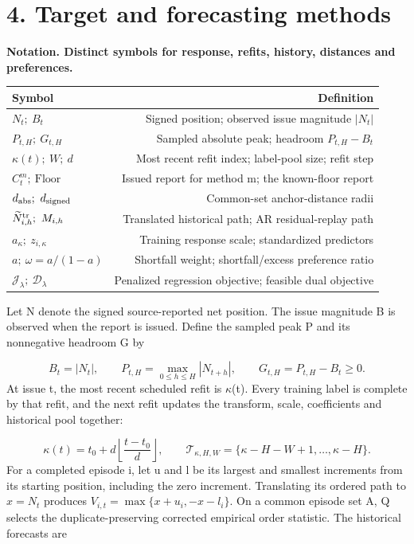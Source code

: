 \documentclass[10pt,a4paper]{article}
\begin{document}
\section*{4. Target and forecasting methods}
\begin{center}
\begin{minipage}{\linewidth}
\small\textbf{Notation. Distinct symbols for response, refits, history, distances and preferences.}\par\medskip
\centering\fontsize{8}{10}\selectfont
\begin{tabular}{lr}
\toprule
Symbol & Definition \\
\midrule
\(N_t;\ B_t\) & Signed position; observed issue magnitude \(|N_t|\) \\
\(P_{t,H};\ G_{t,H}\) & Sampled absolute peak; headroom \(P_{t,H}-B_t\) \\
\(\kappa(t);\ W;\ d\) & Most recent refit index; label-pool size; refit step \\
\(C_t^m;\ \mathrm{Floor}\) & Issued report for method m; the known-floor report \\
\(d_{\rm abs};\ d_{\rm signed}\) & Common-set anchor-distance radii \\
\(\widetilde N_{i,h}^{\rm tr};\ M_{i,h}\) & Translated historical path; AR residual-replay path \\
\(a_\kappa;\ z_{i,\kappa}\) & Training response scale; standardized predictors \\
\(a;\ \omega=a/(1-a)\) & Shortfall weight; shortfall/excess preference ratio \\
\(\mathcal J_\lambda;\ \mathcal D_\lambda\) & Penalized regression objective; feasible dual objective \\
\bottomrule
\end{tabular}
\end{minipage}
\end{center}
Let N denote the signed source-reported net position. The issue magnitude B is observed when the report is issued. Define the sampled peak P and its nonnegative headroom G by

\[
B_t=|N_t|,\qquad P_{t,H}=\max_{0\le h\le H}|N_{t+h}|,\qquad G_{t,H}=P_{t,H}-B_t\ge0.
\]
At issue t, the most recent scheduled refit is \(\kappa\)(t). Every training label is complete by that refit, and the next refit updates the transform, scale, coefficients and historical pool together:

\[
\kappa(t)=t_0+d\left\lfloor\frac{t-t_0}{d}\right\rfloor,\qquad\mathcal T_{\kappa,H,W}=\{\kappa-H-W+1,\ldots,\kappa-H\}.
\]
For a completed episode i, let u and l be its largest and smallest increments from its starting position, including the zero increment. Translating its ordered path to \(x=N_t\) produces \(V_{i,t}=\max\{x+u_i,-x-l_i\}\). On a common episode set A, Q selects the duplicate-preserving corrected empirical order statistic. The historical forecasts are
\end{document}
